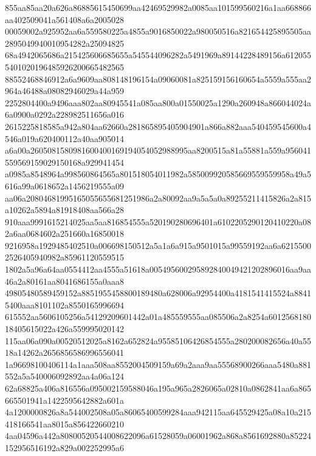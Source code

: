 \documentclass[10pt,letterpaper]{article}
\newenvironment{hexcertificate}{\par\begingroup\ttfamily\scriptsize\raggedright\setlength{\parskip}{0pt}\noindent}{\par\endgroup}
\begin{document}
\begin{hexcertificate}
855aa85aa20a626a86885615450699aa42469529982a0085aa101599560216a1aa668866aa402509041a561408a6a2005028\\
00059002a925952aa6a559580225a4855a9016850022a980050516a821654425895505aa2895049940010954282a25094825\\
68a4942065686a215425606685655a545544096282a5491969a89144228489156a6120555401020196485926200665482565\\
88552468846912a6a9609aa808148196154a09060081a825159156160654a5559a555aa2964a46488a08082946029a44a959\\
2252804400a9496aaa802aa80945541a085aa800a01550025a1290a260948a866044024a6a0900a0292a228982511656a016\\
2615225818585a942a804aa62660a281865895405904901a866a882aaa540459545600a4546a019a620400112a40aa905014\\
a6a00a2605081580981600400169194054052988995aa8200515a81a55881a559a956041559569159029150168a929941454\\
a0985a8548964a998560864565a801518054011982a585009920585669559559958a49a5616a99a0618652a1456219555a09\\
aa06a20804681995165055655681251986a2a80092aa9a5a5a0a89255211415826a2a815a10262a5894a81918408aa566a28\\
910aaa9991615214025aa5aa816854555a520190280696401a6102205290120410220a082a6aa0684602a251660a16850018\\
9216958a1929485402510a006698150512a5a1a6a915a9501015a99559192aa6a62155002526405940982a85961120559515\\
1802a5a96a64aa0554412aa4555a51618a005495600295892840049421202896016aa9aa46a2a80161aa8041686155a0aaa8\\
49805480589459152a8851955458800189480a628006a92954400a4181541415524a88415400aaa8101102a8550165996694\\
615552aa5606105256a54129209601442a01a485559555aa085506a2a8254a601256818018405615022a426a559995020142\\
115aa06a090a00520512025a8162a652824a95585106426854555a280200082656a40a5518a14262a2656856586996556041\\
1a96698100406114a1aaa508aa8552004509159a69a2aaa9aa55568900266aaa5480a881552a5a540006092892aa4a06a124\\
62a68825a406a816556a095002159588046a195a965a2826065a02810a0862841aa6a865665501941a1422595642882a601a\\
4a1200000826a8a544002508a05a86065400599284aaa942115aa645529425a08a10a215418166541aa8015a856422660210\\
4aa04596a442a80800520544008622096a61528059a06001962a868a8561692880a85224152956516192a829a002252995a6\\

\end{hexcertificate}
\end{document}
